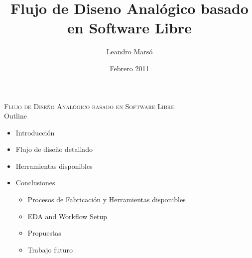 \documentclass[ps,clariphy]{prosper}
\title{ \LARGE{Flujo de Diseno Anal\'ogico basado en Software Libre} }
\author{ Leandro Mars\'o }
\date{ Febrero 2011 }
\begin{document}
\maketitle

\begin{slide}{ \textsc{{\tiny Flujo de Dise\~no Anal\'ogico basado en Software Libre}}\\ Outline}
  \vspace{-0.5cm}
  \tiny{
    \begin{itemize}
    \item Introducci\'on
      \item Flujo de dise\~no detallado
      \item Herramientas disponibles
    \item Conclusiones
      \begin{itemize}
      \item Procesos de Fabricaci\'on y Herramientas disponibles
            \item EDA and Workflow Setup %
	\item Propuestas
      \item Trabajo futuro %
      \end{itemize}
    \end{itemize}
  }
\end{slide}
\end{document}

